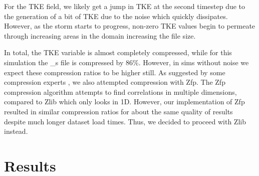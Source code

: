 \documentclass[12pt]{article}
\begin{document}
For the TKE field, we likely get a jump in TKE at the second timestep due to the generation of a bit of TKE due to the noise which quickly dissipates. However, as the storm starts to progress, non-zero TKE values begin to permeate through increasing areas in the domain increasing the file size.

In total, the TKE variable is almost completely compressed, while for this simulation the \_s file is compressed by 86\%. However, in sims without noise we expect these compression ratios to be higher still. As suggested by some compression experts \cite{klower_compressing_2021} \cite{orf_lossy_2022}, we also attempted compression with Zfp. The Zfp compression algorithm attempts to find correlations in multiple dimensions, compared to Zlib which only looks in 1D. However, our implementation of Zfp resulted in similar compression ratios for about the same quality of results despite much longer dataset load times. Thus, we decided to proceed with Zlib instead.

\section{Results}







\newpage

\end{document}
